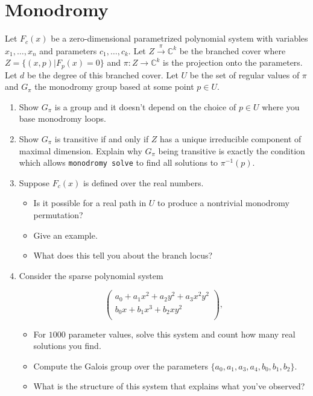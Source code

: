 \documentclass[11pt,reqno]{amsart}
\theoremstyle{definition}
\theoremstyle{remark}
\numberwithin{equation}{section}
\newcommand{\C}{\mathbb{C}}
\begin{document}
\section{Monodromy}
Let $F_c(x)$ be a zero-dimensional parametrized polynomial system with variables $x_1,\ldots,x_n$ and parameters $c_1,\ldots,c_k$. Let $Z \xrightarrow{\pi} \C^k$ be the branched cover where $Z=\{(x,p) | F_p(x)=0\}$ and $\pi:Z \to \C^k$ is the projection onto the parameters. Let $d$ be the degree of this branched cover.
Let $U$ be the set of regular values of $\pi$ and $G_\pi$ the monodromy group based at some point $p \in U$.

\begin{enumerate}
\item Show $G_\pi$ is a group and it doesn't depend on the choice of $p \in U$ where you base monodromy loops.

\item Show $G_\pi$ is transitive if and only if $Z$ has a unique irreducible component of maximal dimension. Explain why $G_\pi$ being transitive is exactly the condition which allows \texttt{monodromy solve} to find all solutions to $\pi^{-1}(p)$.


\item Suppose $F_c(x)$ is defined over the real numbers.
\begin{itemize}
\item  Is it possible for a real path in $U$ to produce a nontrivial monodromy permutation?
\item Give an example.
\item  What does this tell you about the branch locus?
\end{itemize}

\item Consider the sparse polynomial system

$$\begin{pmatrix}
a_0+a_1x^2+a_2y^2+a_3x^2y^2 \\
b_0x+b_1x^3+b_2xy^2\\
\end{pmatrix},$$
\begin{itemize}
\item For $1000$ parameter values, solve this system and count how many real solutions you find.
\item Compute the Galois group over the parameters $\{a_0,a_1,a_3,a_4,b_0,b_1,b_2\}$.
\item What is the structure of this system that explains what you've observed?
\end{itemize}
\end{enumerate}
\end{document}
